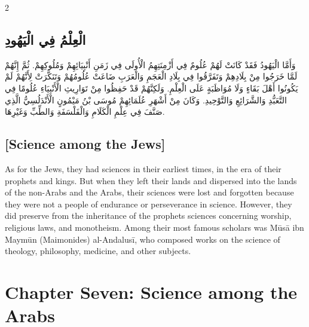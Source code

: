\documentclass[11pt,a4paper]{article}
\newcommand{\ar}[1]{{\arabicfont\beginR #1\endR}}
\begin{document}
\begin{paracol}{2}
\sloppy

\begin{leftcolumn}
\subsection*{\ar{الْعِلْمُ فِي الْيَهُودِ}}
\vspace{0.3cm}
{\arabicfont\beginR
وَأَمَّا الْيَهُودُ فَقَدْ كَانَتْ لَهُمْ عُلُومٌ فِي أَزْمِنَتِهِمُ الْأُولَى فِي زَمَنِ أَنْبِيَائِهِمْ وَمُلُوكِهِمْ. ثُمَّ إِنَّهُمْ لَمَّا خَرَجُوا مِنْ بِلَادِهِمْ وَتَفَرَّقُوا فِي بِلَادِ الْعَجَمِ وَالْعَرَبِ ضَاعَتْ عُلُومُهُمْ وَتَنَكَّرَتْ لِأَنَّهُمْ لَمْ يَكُونُوا أَهْلَ بَقَاءٍ وَلَا مُوَاظَبَةٍ عَلَى الْعِلْمِ. وَلَكِنَّهُمْ قَدْ حَفِظُوا مِنْ تَوَارِيثِ الْأَنْبِيَاءِ عُلُومًا فِي التَّعَبُّدِ وَالشَّرَائِعِ وَالتَّوْحِيدِ. وَكَانَ مِنْ أَشْهَرِ عُلَمَائِهِمْ مُوسَى بْنُ مَيْمُونٍ الْأَنْدَلُسِيُّ الَّذِي صَنَّفَ فِي عِلْمِ الْكَلَامِ وَالْفَلْسَفَةِ وَالطِّبِّ وَغَيْرِهَا.
\endR}
\end{leftcolumn}

\begin{rightcolumn}
\subsection*{[Science among the Jews]}
\vspace{0.3cm}
As for the Jews, they had sciences in their earliest times, in the era of their prophets and kings. But when they left their lands and dispersed into the lands of the non-Arabs and the Arabs, their sciences were lost and forgotten because they were not a people of endurance or perseverance in science. However, they did preserve from the inheritance of the prophets sciences concerning worship, religious laws, and monotheism. Among their most famous scholars was M\={u}s\={a} ibn Maym\={u}n (Maimonides) al-Andalus\={i}, who composed works on the science of theology, philosophy, medicine, and other subjects.
\end{rightcolumn}

\end{paracol}

\clearpage

\section*{Chapter Seven: Science among the Arabs}
\end{document}
